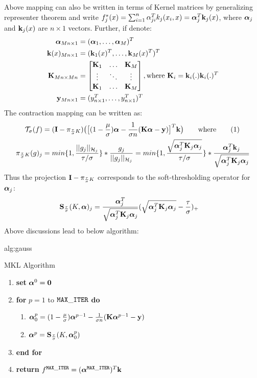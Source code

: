 \documentclass[tablecaption=bottom,wcp]{jmlr} %
\newcommand\numberthis{\addtocounter{equation}{1}\tag{\theequation}}
\begin{document}
Above mapping can also be written in terms of Kernel matrices by  generalizing representer theorem and write $f_j^*(x) = \sum_{i=1}^n \alpha_{ji}^Tk_j(x_i, x) = \boldsymbol{\alpha}_j^T{\bf k}_j(x)$, where $\boldsymbol{\alpha}_j$ and ${\bf k}_j(x)$ are $n \times 1$ vectors. Further, if denote:
\begin{align*}
\boldsymbol{\alpha}_{Mn \times 1} &= (\boldsymbol{\alpha}_1, \dots, \boldsymbol{\alpha}_M)^T\\
{\bf k}(x)_{Mn \times 1} &= ({\bf k}_1(x)^T, \dots, {\bf k}_M(x)^T)^T\\
{\bf K}_{Mn \times Mn} &= 
\begin{bmatrix}
{\bf K}_1 & \dots & {\bf K}_M \\
\vdots & \ddots & \vdots \\
{\bf K}_1 & \dots & {\bf K}_M
\end{bmatrix}
, \mbox{where }{\bf K}_i = {\bf k}_i(.){\bf k}_i(.)^T\\
{\bf y}_{Mn \times 1} &= (y_{n \times 1}^T, \dots, y_{n \times 1}^T)^T
\end{align*}
The contraction mapping can be written as:
\begin{align*}
\Tsc_\sigma(f) &= (\bI - \pi_{\frac{\tau}{\sigma}K}) 
\big( \big[ 
(1-\frac{\mu}{\sigma})\balpha - \frac{1}{\sigma n}(\bK\balpha - \by)\big]^T \bk  \big) \qquad \mbox{where}
\numberthis \label{eq:PFBS}
\\
\pi_{\frac{\tau}{\sigma}K}(g)_j &= 
min\{1, \frac{||g_j||_{\Hsc_j}}{\tau/\sigma}\} * \frac{g_j}{||g_j||_{\Hsc_j}} = 
min\{1, \frac{\sqrt{\balpha^T_j\bK_j\balpha_j}}{\tau/\sigma}\} * \frac{\balpha_j^T\bk_j}{\sqrt{\balpha^T_j\bK_j\balpha_j}}
\end{align*}
Thus the projection ${\bf I} - \pi_{\frac{\tau}{\sigma}K}$ corresponds to the soft-thresholding operator for $\boldsymbol{\alpha}_j$:
\begin{align*}
{\bf S}_{\frac{\tau}{\sigma}}(K, \boldsymbol{\alpha})_j &= 
\frac{\boldsymbol{\alpha}_j^T}{\sqrt{\boldsymbol{\alpha}^T_j{\bf K}_j\boldsymbol{\alpha}_j}}
(\sqrt{\boldsymbol{\alpha}^T_j{\bf K}_j\boldsymbol{\alpha}_j} - \frac{\tau}{\sigma})_+
\end{align*}
Above discussions lead to below algorithm:
\begin{algorithm}[htbp]
\floatconts
  {alg:gauss}%
  {\caption{MKL Algorithm}}%
{%
\begin{enumerate}
  \item[] \textbf{set} $\boldsymbol{\alpha}^0={\bf 0}$
  \item[] \textbf{for} $p=1$ to ${\tt MAX\_ITER}$ \textbf{do}
  \begin{enumerate}
  \item[] $\boldsymbol{\alpha}_0^{p} = (1-\frac{\mu}{\sigma})\boldsymbol{\alpha}^{p-1} - \frac{1}{\sigma n}({\bf K}\boldsymbol{\alpha}^{p-1} - {\bf y}) $
  \item[] $\boldsymbol{\alpha}^p = 
  {\bf S}_{\frac{\tau}{\sigma}}(K, \boldsymbol{\alpha}_0^{p})$
  \end{enumerate}
  \item[] \textbf{end for}
  \item[] \textbf{return} $f^{\tt MAX\_ITER} = (\boldsymbol{\alpha}^{\tt MAX\_ITER})^T{\bf k}$
\end{enumerate}
}%
\end{algorithm}
\end{document}
